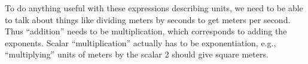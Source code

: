 To do anything useful with these expressions describing units, we need to
be able to talk about things like dividing meters by seconds to get meters
per second. Thus ``addition'' needs to be multiplication, which corresponds to
adding the exponents.  Scalar ``multiplication'' actually has to be exponentiation,
e.g., ``multiplying'' units of meters by the scalar 2 should give square meters.

